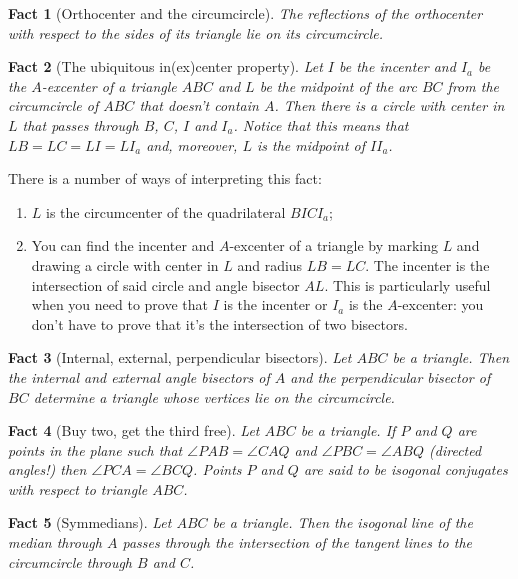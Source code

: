 \documentclass[10pt]{article}
\newtheorem{fact}{Fact}%
\theoremstyle{definition}
\theoremstyle{remark}
\begin{document}
\begin{fact}[Orthocenter and the circumcircle]
The reflections of the orthocenter with respect to the sides of its triangle lie on its circumcircle.
\end{fact}

\begin{fact}[The ubiquitous in(ex)center property]
Let $I$ be the incenter and $I_a$ be the $A$-excenter of a triangle $ABC$ and $L$ be the midpoint of the arc $BC$ from the circumcircle of $ABC$ that doesn't contain $A$. Then there is a circle with center in $L$ that passes through $B$, $C$, $I$ and $I_a$. Notice that this means that $LB = LC = LI = LI_a$ and, moreover, $L$ is the midpoint of $II_a$.
\end{fact}

There is a number of ways of interpreting this fact:
\begin{enumerate}
\item $L$ is the circumcenter of the quadrilateral $BICI_a$;
\item You can find the incenter and $A$-excenter of a triangle by marking $L$ and drawing a circle with center in $L$ and radius $LB = LC$. The incenter is the intersection of said circle and angle bisector $AL$. This is particularly useful when you need to prove that $I$ is the incenter or $I_a$ is the $A$-excenter: you don't have to prove that it's the intersection of two bisectors.
\end{enumerate}

\begin{fact}[Internal, external, perpendicular bisectors]
Let $ABC$ be a triangle. Then the internal and external angle bisectors of $A$ and the perpendicular bisector of $BC$ determine a triangle whose vertices lie on the circumcircle.
\end{fact}

\begin{fact}[Buy two, get the third free]
Let $ABC$ be a triangle. If $P$ and $Q$ are points in the plane such that $\angle PAB = \angle CAQ$ and $\angle PBC = \angle ABQ$ (directed angles!) then $\angle PCA = \angle BCQ$. Points $P$ and $Q$ are said to be isogonal conjugates with respect to triangle $ABC$.
\end{fact}

\begin{fact}[Symmedians]
Let $ABC$ be a triangle. Then the isogonal line of the median through $A$ passes through the intersection of the tangent lines to the circumcircle through $B$ and $C$.
\end{fact}
\end{document}
